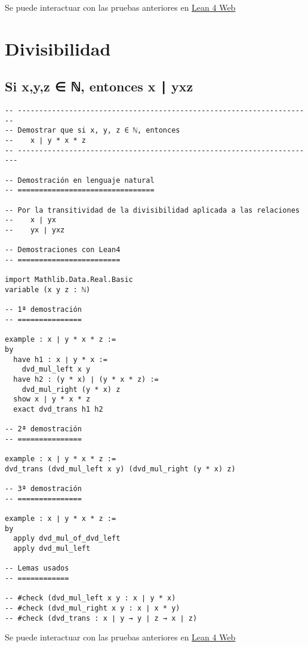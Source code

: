 Se puede interactuar con las pruebas anteriores en \href{https://lean.math.hhu.de/\#url=https://raw.githubusercontent.com/jaalonso/Calculemus2/main/src/Acotacion\_del\_producto.lean}{Lean 4 Web}

\chapter{Divisibilidad}
\label{sec:org5dc1553}

\section{Si x,y,z ∈ ℕ, entonces x ∣ yxz}
\label{sec:org39fed8d}
\begin{verbatim}
-- ---------------------------------------------------------------------
-- Demostrar que si x, y, z ∈ ℕ, entonces
--    x ∣ y * x * z
-- ----------------------------------------------------------------------

-- Demostración en lenguaje natural
-- ================================

-- Por la transitividad de la divisibilidad aplicada a las relaciones
--    x ∣ yx
--    yx ∣ yxz

-- Demostraciones con Lean4
-- ========================

import Mathlib.Data.Real.Basic
variable (x y z : ℕ)

-- 1ª demostración
-- ===============

example : x ∣ y * x * z :=
by
  have h1 : x ∣ y * x :=
    dvd_mul_left x y
  have h2 : (y * x) ∣ (y * x * z) :=
    dvd_mul_right (y * x) z
  show x ∣ y * x * z
  exact dvd_trans h1 h2

-- 2ª demostración
-- ===============

example : x ∣ y * x * z :=
dvd_trans (dvd_mul_left x y) (dvd_mul_right (y * x) z)

-- 3ª demostración
-- ===============

example : x ∣ y * x * z :=
by
  apply dvd_mul_of_dvd_left
  apply dvd_mul_left

-- Lemas usados
-- ============

-- #check (dvd_mul_left x y : x ∣ y * x)
-- #check (dvd_mul_right x y : x ∣ x * y)
-- #check (dvd_trans : x ∣ y → y ∣ z → x ∣ z)
\end{verbatim}
Se puede interactuar con las pruebas anteriores en \href{https://lean.math.hhu.de/\#url=https://raw.githubusercontent.com/jaalonso/Calculemus2/main/src/Divisibilidad\_de\_producto.lean}{Lean 4 Web}

